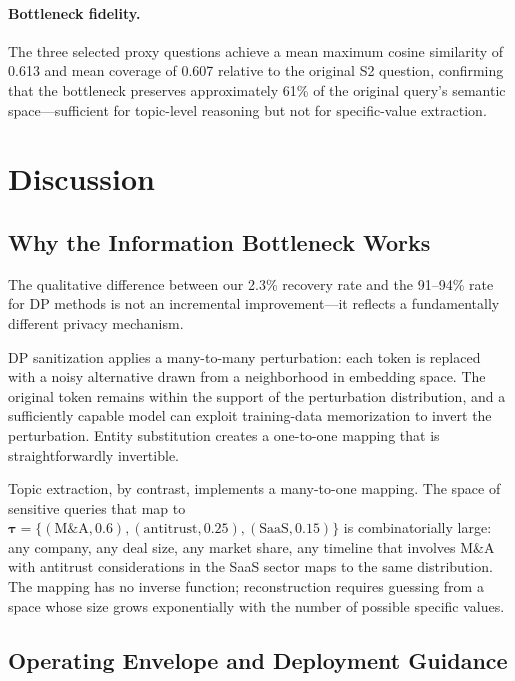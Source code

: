 \documentclass[sigconf,anonymous,review,balance=false]{acmart}
\begin{document}
\paragraph{Bottleneck fidelity.} The three selected proxy questions achieve a mean maximum cosine similarity of 0.613 and mean coverage of 0.607 relative to the original S2 question, confirming that the bottleneck preserves approximately 61\% of the original query's semantic space---sufficient for topic-level reasoning but not for specific-value extraction.

\section{Discussion}
\label{sec:discussion}

\subsection{Why the Information Bottleneck Works}
\label{sec:why-works}

The qualitative difference between our 2.3\% recovery rate and the 91--94\% rate for DP methods is not an incremental improvement---it reflects a fundamentally different privacy mechanism.

DP sanitization applies a many-to-many perturbation: each token is replaced with a noisy alternative drawn from a neighborhood in embedding space. The original token remains within the support of the perturbation distribution, and a sufficiently capable model can exploit training-data memorization to invert the perturbation. Entity substitution creates a one-to-one mapping that is straightforwardly invertible.

Topic extraction, by contrast, implements a many-to-one mapping. The space of sensitive queries that map to $\boldsymbol{\tau} = \{(\text{M\&A}, 0.6), (\text{antitrust}, 0.25), (\text{SaaS}, 0.15)\}$ is combinatorially large: any company, any deal size, any market share, any timeline that involves M\&A with antitrust considerations in the SaaS sector maps to the same distribution. The mapping has no inverse function; reconstruction requires guessing from a space whose size grows exponentially with the number of possible specific values.

\subsection{Operating Envelope and Deployment Guidance}
\label{sec:envelope}
\end{document}
